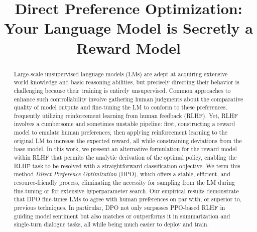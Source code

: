 \title{Direct Preference Optimization: Your Language Model is Secretly a Reward Model}

\begin{abstract}
Large-scale unsupervised language models (LMs) are adept at acquiring extensive world knowledge and basic reasoning abilities, but precisely directing their behavior is challenging because their training is entirely unsupervised. Common approaches to enhance such controllability involve gathering human judgments about the comparative quality of model outputs and fine-tuning the LM to conform to these preferences, frequently utilizing reinforcement learning from human feedback (RLHF). Yet, RLHF involves a cumbersome and sometimes unstable pipeline: first, constructing a reward model to emulate human preferences, then applying reinforcement learning to the original LM to increase the expected reward, all while constraining deviations from the base model. In this work, we present an alternative formulation for the reward model within RLHF that permits the analytic derivation of the optimal policy, enabling the RLHF task to be resolved with a straightforward classification objective. We term this method \textit{Direct Preference Optimization} (DPO), which offers a stable, efficient, and resource-friendly process, eliminating the necessity for sampling from the LM during fine-tuning or for extensive hyperparameter search. Our empirical results demonstrate that DPO fine-tunes LMs to agree with human preferences on par with, or superior to, previous techniques. In particular, DPO not only surpasses PPO-based RLHF in guiding model sentiment but also matches or outperforms it in summarization and single-turn dialogue tasks, all while being much easier to deploy and train.
\end{abstract}

